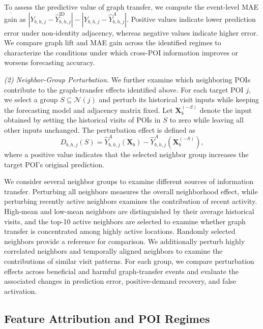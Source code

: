 \documentclass[preprint,authoryear,11pt]{elsarticle}
\theoremstyle{definition}
\begin{document}
To assess the predictive value of graph transfer, we compute the event-level MAE gain as
\(|Y_{b,h,j}-\hat Y_{b,h,j}^{\mathrm{ID}}|-|Y_{b,h,j}-\hat Y_{b,h,j}^{A}|\).
Positive values indicate lower prediction error under non-identity adjacency, whereas negative values indicate higher error.
We compare graph lift and MAE gain across the identified regimes to characterize the conditions under which cross-POI information improves or worsens forecasting accuracy.

\textit{(2) Neighbor-Group Perturbation.}
We further examine which neighboring POIs contribute to the graph-transfer effects identified above.
For each target POI \(j\), we select a group \(S\subseteq\mathcal{N}(j)\) and perturb its historical visit inputs while keeping the forecasting model and adjacency matrix fixed.
Let \(\mathbf{X}_b^{(-S)}\) denote the input obtained by setting the historical visits of POIs in \(S\) to zero while leaving all other inputs unchanged.
The perturbation effect is defined as
\begin{equation}
D_{b,h,j}(S)
=
\hat Y_{b,h,j}^{A}(\mathbf{X}_b)
-
\hat Y_{b,h,j}^{A}(\mathbf{X}_b^{(-S)}),
\label{eq:perturbation_effect}
\end{equation}
where a positive value indicates that the selected neighbor group increases the target POI's original prediction.

We consider several neighbor groups to examine different sources of information transfer.
Perturbing all neighbors measures the overall neighborhood effect, while perturbing recently active neighbors examines the contribution of recent activity.
High-mean and low-mean neighbors are distinguished by their average historical visits, and the top-10 active neighbors are selected to examine whether graph transfer is concentrated among highly active locations.
Randomly selected neighbors provide a reference for comparison.
We additionally perturb highly correlated neighbors and temporally aligned neighbors to examine the contributions of similar visit patterns.
For each group, we compare perturbation effects across beneficial and harmful graph-transfer events and evaluate the associated changes in prediction error, positive-demand recovery, and false activation.

\subsection{Feature Attribution and POI Regimes}
\label{subsec:attribution_method}
\end{document}
